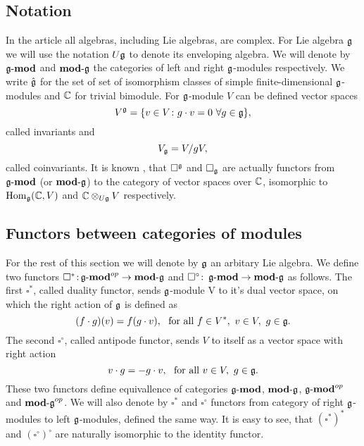% 

\subsection{Notation} 
In the article all algebras, including Lie algebras, are complex. 
For Lie algebra $\mathfrak{g}$ we will use the notation $U\mathfrak{g}$ to denote its enveloping algebra. We will
denote by $\operatorname{\mathbf{\mathfrak{g}-mod}}$ and $\operatorname{\mathbf{mod-\mathfrak{g}}}$ the categories of left and right $\mathfrak{g}$-modules respectively. 
We write $\hat{\mathfrak{g}}$ for the set of set of isomorphism classes of simple finite-dimensional
$\mathfrak{g}$-modules and $\mathbb{C}$ for trivial bimodule. 
For $\mathfrak{g}$-module $V$ can be defined vector spaces 
\begin{equation}
    V^{\mathfrak{g}} = \{v\in V\colon g\cdot v = 0 ~ \forall g\in \mathfrak{g} \}, 
\end{equation}
called invariants and
\begin{equation}
    V_{\mathfrak{g}} = V/gV,
\end{equation}
called coinvariants. It is known , that $\square^{\mathfrak{g}}$ and $\square_{\mathfrak{g}}$ are actually functors
from $\operatorname{\mathbf{\mathfrak{g}-mod}}$ (or $\operatorname{\mathbf{mod-\mathfrak{g}}}$) to the category of vector spaces over $\mathbb{C}$, isomorphic to
$\operatorname{Hom}_{\mathfrak{g}}(\mathbb{C}, V)$ and $\mathbb{C} \otimes_{U\mathfrak{g}} V$ respectively. 

\subsection{Functors between categories of modules}
For the rest of this section we will denote by $\mathfrak{g}$ an arbitary Lie algebra.
We define two functors $\square^*\colon \\ \operatorname{\mathbf{\mathfrak{g}-mod}}^{op} \to \operatorname{\mathbf{mod-\mathfrak{g}}}$ and $\square^\circ\colon
\operatorname{\mathbf{\mathfrak{g}-mod}} \to \operatorname{\mathbf{mod-\mathfrak{g}}}$ as follows. The first $\square^*$, called duality functor, sends 
$\mathfrak{g}$-module V to it's dual vector space, on which the right action of $\mathfrak{g}$ is defined as 
\[
    (f\cdot g) (v) = f(g\cdot v),~\text{ for all } f\in V^*,~v \in V,~g\in\mathfrak{g}.
\]
The second $\square^\circ$, called antipode functor, sends $V$ to itself as a vector space with right
action
\[\label{test}
    v\cdot g = - g\cdot v,~\text{ for all } v \in V,~g\in\mathfrak{g}.
\]
These two functors define equivallence of categories $\operatorname{\mathbf{\mathfrak{g}-mod}}$, $\operatorname{\mathbf{mod-\mathfrak{g}}}$, $\operatorname{\mathbf{\mathfrak{g}-mod}}^{op}$
and $\operatorname{\mathbf{mod-\mathfrak{g}}}^{op}$. We will also denote by $\square^*$ and $\square^\circ$ functors from
category of right $\mathfrak{g}$-modules to left $\mathfrak{g}$-modules, defined the same way. It is easy to
see, that $(\square^*)^*$ and $(\square^\circ)^\circ$ are naturally isomorphic to the identity functor.

